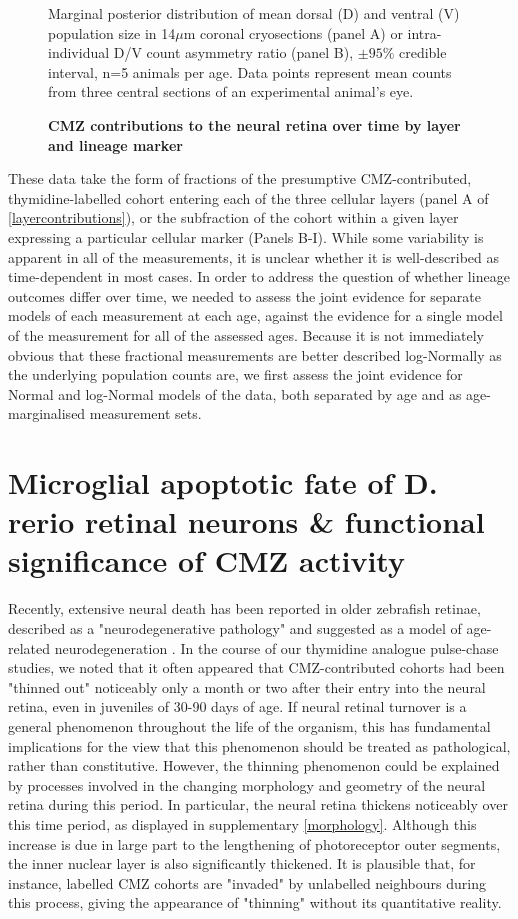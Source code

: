 \begin{figure}[!h]
    \caption{{\bf CMZ contributions to the neural retina over time by layer and lineage marker}}
    Marginal posterior distribution of mean dorsal (D) and ventral (V) population size in 14$\mu$m coronal cryosections (panel A) or intra-individual D/V count asymmetry ratio (panel B), $\pm 95\%$ credible interval, n=5 animals per age. Data points represent mean counts from three central sections of an experimental animal's eye. 
    \label{layercontributions}
\end{figure}

These data take the form of fractions of the presumptive CMZ-contributed, thymidine-labelled cohort entering each of the three cellular layers (panel A of \autoref{layercontributions}), or the subfraction of the cohort within a given layer expressing a particular cellular marker (Panels B-I). While some variability is apparent in all of the measurements, it is unclear whether it is well-described as time-dependent in most cases. In order to address the question of whether lineage outcomes differ over time, we needed to assess the joint evidence for separate models of each measurement at each age, against the evidence for a single model of the measurement for all of the assessed ages. Because it is not immediately obvious that these fractional measurements are better described log-Normally as the underlying population counts are, we first assess the joint evidence for Normal and log-Normal models of the data, both separated by age and as age-marginalised measurement sets.

\section{Microglial apoptotic fate of D. rerio retinal neurons \& functional significance of CMZ activity}
\label{sec:neuralfate}
Recently, extensive neural death has been reported in older zebrafish retinae, described as a "neurodegenerative pathology" and suggested as a model of age-related neurodegeneration \cite{Vanhoucke2018}. In the course of our thymidine analogue pulse-chase studies, we noted that it often appeared that CMZ-contributed cohorts had been "thinned out" noticeably only a month or two after their entry into the neural retina, even in juveniles of 30-90 days of age. If neural retinal turnover is a general phenomenon throughout the life of the organism, this has fundamental implications for the view that this phenomenon should be treated as pathological, rather than constitutive. However, the thinning phenomenon could be explained by processes involved in the changing morphology and geometry of the neural retina during this period. In particular, the neural retina thickens noticeably over this time period, as displayed in supplementary \autoref{morphology}. Although this increase is due in large part to the lengthening of photoreceptor outer segments, the inner nuclear layer is also significantly thickened. It is plausible that, for instance, labelled CMZ cohorts are "invaded" by unlabelled neighbours during this process, giving the appearance of "thinning" without its quantitative reality.

